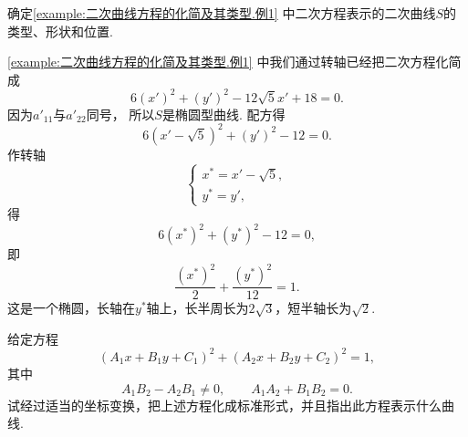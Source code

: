 \begin{example}
确定\cref{example:二次曲线方程的化简及其类型.例1} 中二次方程表示的二次曲线\(S\)的类型、形状和位置.
\begin{solution}
\cref{example:二次曲线方程的化简及其类型.例1} 中我们通过转轴已经把二次方程化简成\begin{equation*}
	6(x')^2 + (y')^2 - 12\sqrt5 x' + 18 = 0.
\end{equation*}
因为\(a'_{11}\)与\(a'_{22}\)同号，
所以\(S\)是椭圆型曲线.
配方得\begin{equation*}
	6(x' - \sqrt5)^2 + (y')^2 - 12 = 0.
\end{equation*}
作转轴\begin{equation*}
	\left\{ \begin{array}{l}
		x^* = x' - \sqrt5, \\
		y^* = y',
	\end{array} \right.
\end{equation*}
得\begin{equation*}
	6(x^*)^2 + (y^*)^2 - 12 = 0,
\end{equation*}
即\begin{equation*}
	\frac{(x^*)^2}{2} + \frac{(y^*)^2}{12} = 1.
\end{equation*}
这是一个椭圆，长轴在\(y^*\)轴上，长半周长为\(2\sqrt3\)，短半轴长为\(\sqrt2\).
\end{solution}
\end{example}

\begin{example}
给定方程\begin{equation*}
	(A_1 x + B_1 y + C_1)^2 + (A_2 x + B_2 y + C_2)^2 = 1,
\end{equation*}
其中\begin{equation*}
	A_1 B_2 - A_2 B_1 \neq 0,
	\qquad
	A_1 A_2 + B_1 B_2 = 0.
\end{equation*}
试经过适当的坐标变换，把上述方程化成标准形式，并且指出此方程表示什么曲线.
\end{example}
